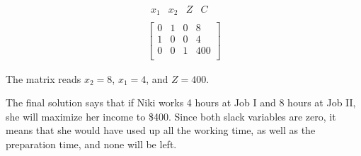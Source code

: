 \begin{solution}
\begin{enumerate}
              \[
                  \begin{array}{c}
                      \begin{array}{cccc}
                          x_1 & x_2 & Z & C
                      \end{array} \\
                      \left[
                          \begin{array}{ccc|c}
                              0 & 1 & 0 & 8   \\
                              1 & 0 & 0 & 4   \\
                              0 & 0 & 1 & 400 \\
                          \end{array}
                          \right]
                  \end{array}
              \]


              The matrix reads \(x_2 = 8\), \(x_1 = 4\), and \(Z = 400\).

              The final solution says that if Niki works 4 hours at Job I and 8 hours at Job II, she will maximize her income to \$400. Since both slack variables are zero, it means that she would have used up all the working time, as well as the preparation time, and none will be left.
    \end{enumerate}
\end{solution}